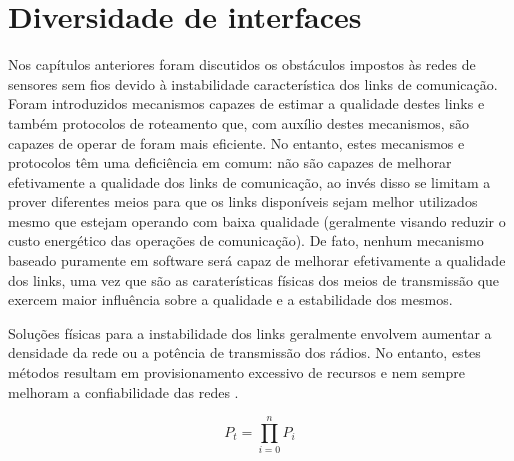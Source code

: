 \documentclass[
	12pt,				%
	openright,			%
	oneside,
	a4paper,			%
	english,			%
	french,				%
	spanish,			%
	brazil				%
	]{abntex2}
\begin{document}
\chapter{Diversidade de interfaces}

Nos capítulos anteriores foram discutidos os obstáculos impostos às redes de sensores sem fios devido à instabilidade característica dos links de comunicação. Foram introduzidos mecanismos capazes de estimar a qualidade destes links e também protocolos de roteamento que, com auxílio destes mecanismos, são capazes de operar de foram mais eficiente. No entanto, estes mecanismos e protocolos têm uma deficiência em comum: não são capazes de melhorar efetivamente a qualidade dos links de comunicação, ao invés disso se limitam a prover diferentes meios para que os links disponíveis sejam melhor utilizados mesmo que estejam operando com baixa qualidade (geralmente visando reduzir o custo energético das operações de comunicação). De fato, nenhum mecanismo baseado puramente em software será capaz de melhorar efetivamente a qualidade dos links, uma vez que são as caraterísticas físicas dos meios de transmissão que exercem maior influência sobre a qualidade e a estabilidade dos mesmos.

Soluções físicas para a instabilidade dos links geralmente envolvem aumentar a densidade da rede ou a potência de transmissão dos rádios. No entanto, estes métodos resultam em provisionamento excessivo de recursos e nem sempre melhoram a confiabilidade das redes \cite{Kusy2011}.

\begin{equation}
	P_{t} = \prod_{i = 0}^{n}P_{i}
	\label{eq_indep_fail_prob}
\end{equation}
\end{document}
